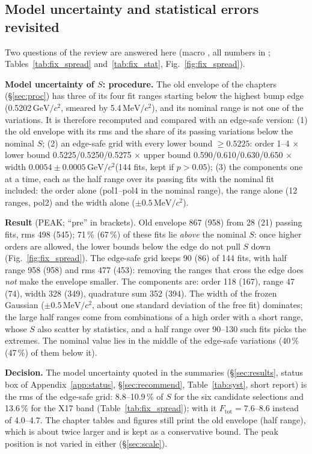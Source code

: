\documentclass[11pt,a4paper]{article}
\newcommand{\GeVcc}{\ensuremath{\mathrm{GeV}/c^{2}}\xspace}
\newcommand{\MeVcc}{\ensuremath{\mathrm{MeV}/c^{2}}\xspace}
\newcommand{\code}[1]{\texttt{\detokenize{#1}}}
\begin{document}
\subsection{Model uncertainty and statistical errors revisited}
\label{sec:fixmodel}
Two questions of the review are answered here (macro \code{plots/exp_report/fix_checks.C}, all numbers in
\code{tables_exp/fix_checks.txt}; Tables~\ref{tab:fix_spread} and~\ref{tab:fix_stat}, Fig.~\ref{fig:fix_spread}).

\textbf{Model uncertainty of $S$: procedure.} The old envelope of the chapters (\S\ref{sec:proc}) has three of its four fit
ranges starting below the highest bump edge (0.5202\,\GeVcc, smeared by 5.4\,\MeVcc), and its nominal range is not one of the
variations. It is therefore recomputed and compared with an edge-safe version: (1) the old envelope with its rms and the share
of its passing variations below the nominal $S$; (2) an edge-safe grid with every lower bound $\ge0.5225$: order 1--4 $\times$
lower bound 0.5225/0.5250/0.5275 $\times$ upper bound 0.590/0.610/0.630/0.650 $\times$ width $0.0054\pm0.0005$\,\GeVcc (144 fits,
kept if $p>0.05$); (3) the components one at a time, each as the half range over its passing fits with the nominal fit included:
the order alone (pol1--pol4 in the nominal range), the range alone (12 ranges, pol2) and the width alone ($\pm0.5$\,\MeVcc).

\textbf{Result} (PEAK; ``pre'' in brackets). Old envelope 867 (958) from 28 (21) passing fits, rms 498 (545); 71\,\% (67\,\%) of
these fits lie \emph{above} the nominal $S$: once higher orders are allowed, the lower bounds below the edge do not pull $S$ down
(Fig.~\ref{fig:fix_spread}). The edge-safe grid keeps 90 (86) of 144 fits, with half range 958 (958) and rms 477 (453): removing
the ranges that cross the edge does \emph{not} make the envelope smaller. The components are: order 118 (167), range 47 (74),
width 328 (349), quadrature sum 352 (394). The width of the frozen Gaussian ($\pm0.5$\,\MeVcc, about one standard deviation of
the free fit) dominates; the large half ranges come from combinations of a high order with a short range, whose $S$ also scatter
by statistics, and a half range over 90--130 such fits picks the extremes. The nominal value lies in the middle of the edge-safe
variations (40\,\% (47\,\%) of them below it).

\textbf{Decision.} The model uncertainty quoted in the summaries (\S\ref{sec:results}, status box of Appendix~\ref{app:status}, \S\ref{sec:recommend}, Table~\ref{tab:syst}, short
report) is the rms of the edge-safe grid: 8.8--10.9\,\% of $S$ for the six candidate selections and 13.6\,\% for the X17 band
(Table~\ref{tab:fix_spread}); with it $F_{\mathrm{tot}}=7.6$--8.6 instead of 4.0--4.7. The chapter tables and figures still print
the old envelope (half range), which is about twice larger and is kept as a conservative bound. The peak position is not varied in
either (\S\ref{sec:scale}).
\end{document}
